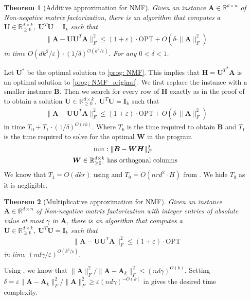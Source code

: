 \documentclass[11pt]{article}
\makeatletter
\theoremstyle{plain}
\newtheorem{theorem}{Theorem}[section]
\theoremstyle{plain}
\theoremstyle{definition}
\theoremstyle{plain}
\theoremstyle{remark}
\newenvironment{proof}[1][\protect\proofname]{\par
	\normalfont\topsep6\p@\@plus6\p@\relax
	\trivlist
	\itemindent\parindent
	\item[\hskip\labelsep\scshape #1]\ignorespaces
}{\endtrivlist\@endpefalse
}
\providecommand{\proofname}{Proof}
\newcommand{\RR}{\mathbb{R}}
\newcommand{\opt}{\ensuremath{\text{OPT}}\xspace}
\makeatother
\begin{document}
\begin{theorem}[Additive approximation for NMF] \label{thm:NMF-additive}
Given an instance $\bm{A}\in \RR^{d\times n}$ of Non-negative matrix factorization, there is an algorithm that computes a $\bm{U}\in \RR^{d\times k}_{\geq 0}, \; \bm{U}^T\bm{U}=\bm{I}_k$ such that 
\begin{align*}
    \|\bm{A}-\bm{U}\bm{U}^T\bm{A}\|_F^2 \leq (1+\varepsilon)\cdot \opt + O(\delta\cdot \|\bm{A}\|_F^2)
\end{align*}
in time $O(dk^2/\varepsilon)\cdot (1/
\delta)^{O(k^2/\varepsilon)}$. For any $0<\delta<1$. 
\end{theorem}
\begin{proof}
   Let $\bm{U}^*$ be the optimal solution to \ref{prog: NMF}. This implies that $\bm{H}={\bm{U}^T}^*\bm{A}$ is an optimal solution to \ref{prog: NMF_original}. We first replace the instance with a smaller instance $\bm{B}$. Then we search for every row of $\bm{H}$ exactly as in the proof of  to obtain a solution $\bm{U}\in \RR^{d\times k}_{\geq 0}, \; \bm{U}^T\bm{U}=\bm{I}_k$ such that 
   \begin{align*}
    \|\bm{A}-\bm{U}\bm{U}^T\bm{A}\|_F^2 \leq (1+\varepsilon)\cdot \opt + O(\delta\cdot \|\bm{A}\|_F^2)
\end{align*}
in time $T_0+T_1\cdot(1/\delta)^{O(rk)}$. Where $T_0$ is the time required to obtain $\bm{B}$ and $T_1$ is the time required to solve for the optimal $\bm{W}$ in the program 
    \begin{align*}
        \min&: \|\bm{B}-\bm{W}\bm{H}\|_F^2 \\
   \bm{W}\in \RR^{d\times k}_{\geq 0} & \textnormal{ has orthogonal columns }
    \end{align*}
    We know that $T_1= O(dkr)$ using  and $T_0=O(nrd^2\cdot H)$ from . We hide $T_0$ as it is negligible. 
\end{proof}


\begin{theorem}[Multiplicative approximation for NMF]\label{thm:NMF-multiplicative}
Given an instance $\bm{A}\in \RR^{d\times n}$ of Non-negative matrix factorization with integer entries of absolute value at most $\gamma$ in $\bm{A}$, there is an algorithm that computes a $\bm{U}\in \RR^{d\times k}_{\geq 0}, \; \bm{U}^T\bm{U}=\bm{I}_k$ such that 
\begin{align*}
    \|\bm{A}-\bm{U}\bm{U}^T\bm{A}\|_F^2 \leq (1+\varepsilon)\cdot \opt 
\end{align*}
in time $(nd\gamma/\varepsilon)^{O(k^3/\varepsilon)}$. 
\end{theorem}
\begin{proof}
Using , we know that $\|\bm{A}\|_F^2/\|\bm{A}-\bm{A}_k\|_F^2\leq (nd\gamma)^{O(k)}$. Setting $\delta= \varepsilon\|\bm{A}-\bm{A}_k\|_F^2/\|\bm{A}\|_F^2\geq \varepsilon (nd\gamma)^{-O(k)}$ in  gives the desired time complexity.  
\end{proof}
\end{document}
